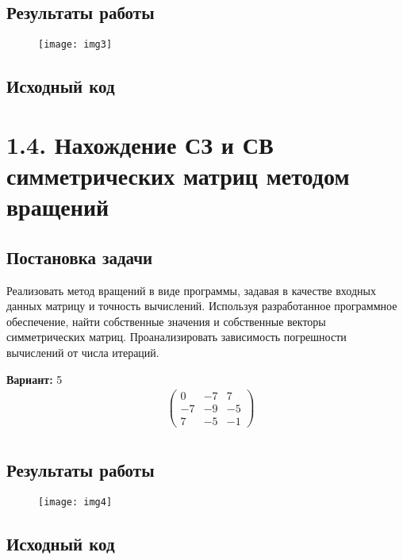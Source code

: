 \subsection{Результаты работы}
\begin{figure}[h!]
\raggedright
\texttt{[image: img3]}
\end{figure}
\pagebreak

\subsection{Исходный код}

\pagebreak

\section* {1.4. Нахождение СЗ и СВ симметрических матриц методом вращений}

\setcounter{subsection}{0}

\subsection{Постановка задачи}
Реализовать метод вращений в виде программы, задавая в качестве входных данных матрицу и точность вычислений. Используя разработанное программное обеспечение, найти собственные значения и собственные векторы симметрических матриц. Проанализировать зависимость погрешности вычислений от числа итераций.    

{\bfseries Вариант:} 5
\begin{align*}
& \begin{pmatrix}
0 & -7 & 7 \\
-7 & -9 & -5 \\
7 & -5 & -1
\end{pmatrix} \\
\end{align*}

\subsection{Результаты работы}
\begin{figure}[h!]
\raggedright
\texttt{[image: img4]}
\end{figure}
\pagebreak

\subsection{Исходный код}

\pagebreak

